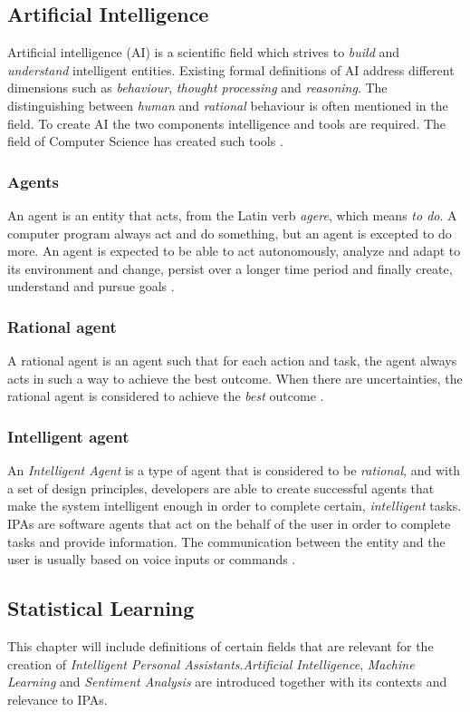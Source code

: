 \documentclass[preprint,12pt]{elsarticle}
\begin{document}
\subsection{Artificial Intelligence}
Artificial intelligence (AI) is a scientific field which strives to \textit{build} and \textit{understand} intelligent entities. Existing formal definitions of AI address different dimensions such as \textit{behaviour}, \textit{thought processing} and \textit{reasoning}. The distinguishing between \textit{human} and \textit{rational} behaviour is often mentioned in the field. To create AI the two components intelligence and tools are required. The field of Computer Science has created such tools \cite{russel2009}.

\subsubsection{Agents}
An agent is an entity that acts, from the Latin verb \textit{agere}, which means \textit{to do}. A computer program always act and do something, but an agent is excepted to do more. An agent is expected to be able to act autonomously, analyze and adapt to its environment and change, persist over a longer time period and finally create, understand and pursue goals \cite{russel2009}. 

\subsubsection{Rational agent}
A rational agent is an agent such that for each action and task, the agent always acts in such a way to achieve the best outcome. When there are uncertainties, the rational agent is considered to achieve the \textit{best} outcome \cite{russel2009}.

\subsubsection{Intelligent agent}
An \textit{Intelligent Agent} is a type of agent that is considered to be \textit{rational}, and with a set of design principles, developers are able to create successful agents that make the system  intelligent enough in order to complete certain, \textit{intelligent} tasks. IPAs are software agents that act on the behalf of the user in order to complete tasks and provide information. The communication between the entity and the user is usually based on voice inputs or commands \cite{russel2009}.

\subsection{Statistical Learning}
This chapter will include definitions of certain fields that are relevant for the creation of \textit{Intelligent Personal Assistants}.\textit{Artificial Intelligence}, \textit{Machine Learning} and \textit{Sentiment Analysis} are introduced together with its contexts and relevance to IPAs.
\end{document}
